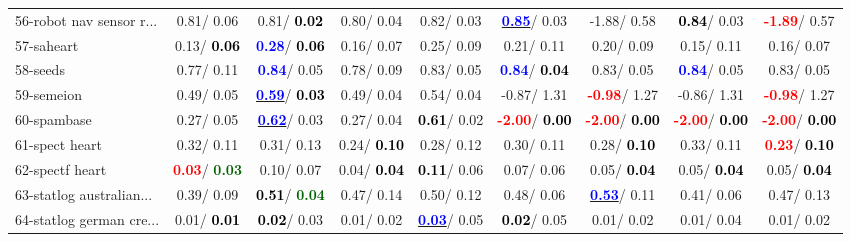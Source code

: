 \begin{table}[h]
\begin{center}
\begin{tabular}{lc|c|c|c|c|c|c|c}
56-robot nav sensor r... &   0.81/  0.06 &   0.81/\textcolor{black}{\textbf{  0.02}} &   0.80/  0.04 &   0.82/  0.03 & \underline{\textcolor{blue}{\textbf{  0.85}}}/  0.03 &  -1.88/  0.58 & \textcolor{black}{\textbf{  0.84}}/  0.03 & \textcolor{red}{\textbf{ -1.89}}/  0.57 \\
57-saheart &   0.13/\textcolor{black}{\textbf{  0.06}} & \textcolor{blue}{\textbf{  0.28}}/\textcolor{black}{\textbf{  0.06}} &   0.16/  0.07 &   0.25/  0.09 &   0.21/  0.11 &   0.20/  0.09 &   0.15/  0.11 &   0.16/  0.07 \\
58-seeds &   0.77/  0.11 & \textcolor{blue}{\textbf{  0.84}}/  0.05 &   0.78/  0.09 &   0.83/  0.05 & \textcolor{blue}{\textbf{  0.84}}/\textcolor{black}{\textbf{  0.04}} &   0.83/  0.05 & \textcolor{blue}{\textbf{  0.84}}/  0.05 &   0.83/  0.05 \\
59-semeion &   0.49/  0.05 & \underline{\textcolor{blue}{\textbf{  0.59}}}/\textcolor{black}{\textbf{  0.03}} &   0.49/  0.04 &   0.54/  0.04 &  -0.87/  1.31 & \textcolor{red}{\textbf{ -0.98}}/  1.27 &  -0.86/  1.31 & \textcolor{red}{\textbf{ -0.98}}/  1.27 \\
60-spambase &   0.27/  0.05 & \underline{\textcolor{blue}{\textbf{  0.62}}}/  0.03 &   0.27/  0.04 & \textcolor{black}{\textbf{  0.61}}/  0.02 & \textcolor{red}{\textbf{ -2.00}}/\textcolor{black}{\textbf{  0.00}} & \textcolor{red}{\textbf{ -2.00}}/\textcolor{black}{\textbf{  0.00}} & \textcolor{red}{\textbf{ -2.00}}/\textcolor{black}{\textbf{  0.00}} & \textcolor{red}{\textbf{ -2.00}}/\textcolor{black}{\textbf{  0.00}} \\ \hline
61-spect heart &   0.32/  0.11 &   0.31/  0.13 &   0.24/\textcolor{black}{\textbf{  0.10}} &   0.28/  0.12 &   0.30/  0.11 &   0.28/\textcolor{black}{\textbf{  0.10}} &   0.33/  0.11 & \textcolor{red}{\textbf{  0.23}}/\textcolor{black}{\textbf{  0.10}} \\
62-spectf heart & \textcolor{red}{\textbf{  0.03}}/\textcolor{darkgreen}{\textbf{  0.03}} &   0.10/  0.07 &   0.04/\textcolor{black}{\textbf{  0.04}} & \textcolor{black}{\textbf{  0.11}}/  0.06 &   0.07/  0.06 &   0.05/\textcolor{black}{\textbf{  0.04}} &   0.05/\textcolor{black}{\textbf{  0.04}} &   0.05/\textcolor{black}{\textbf{  0.04}} \\
63-statlog australian... &   0.39/  0.09 & \textcolor{black}{\textbf{  0.51}}/\textcolor{darkgreen}{\textbf{  0.04}} &   0.47/  0.14 &   0.50/  0.12 &   0.48/  0.06 & \underline{\textcolor{blue}{\textbf{  0.53}}}/  0.11 &   0.41/  0.06 &   0.47/  0.13 \\
64-statlog german cre... &   0.01/\textcolor{black}{\textbf{  0.01}} & \textcolor{black}{\textbf{  0.02}}/  0.03 &   0.01/  0.02 & \underline{\textcolor{blue}{\textbf{  0.03}}}/  0.05 & \textcolor{black}{\textbf{  0.02}}/  0.05 &   0.01/  0.02 &   0.01/  0.04 &   0.01/  0.02 \\\end{tabular}\label{stratsALCKappa1bVFDT}
\end{center}
\end{table}
